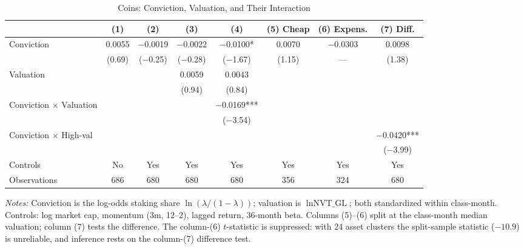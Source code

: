 \documentclass[12pt]{article}
\begin{document}
\begin{table}[ht]
\centering
\caption{Coins: Conviction, Valuation, and Their Interaction}
\label{tab:coin_ladder}
\small
\begin{tabular}{lccccccc}
\toprule
 & (1) & (2) & (3) & (4) & (5) Cheap & (6) Expens. & (7) Diff. \\
\midrule
Conviction & 0.0055 & $-$0.0019 & $-$0.0022 & $-$0.0100* & 0.0070 & $-$0.0303 & 0.0098 \\
 & (0.69) & ($-$0.25) & ($-$0.28) & ($-$1.67) & (1.15) & --- & (1.38) \\
Valuation & & & 0.0059 & 0.0043 & & & \\
 & & & (0.94) & (0.84) & & & \\
Conviction $\times$ Valuation & & & & $-$0.0169*** & & & \\
 & & & & ($-$3.54) & & & \\
Conviction $\times$ High-val & & & & & & & $-$0.0420*** \\
 & & & & & & & ($-$3.99) \\
\midrule
Controls & No & Yes & Yes & Yes & Yes & Yes & Yes \\
Observations & 686 & 680 & 680 & 680 & 356 & 324 & 680 \\
\bottomrule
\end{tabular}
\smallskip

\parbox{0.92\linewidth}{\footnotesize
\textit{Notes:} Conviction is the log-odds staking share $\ln(\lambda/(1-\lambda))$;
valuation is $\ln \text{NVT\_GL}$; both standardized within class-month. Controls: log
market cap, momentum (3m, 12--2), lagged return, 36-month beta. Columns (5)--(6) split
at the class-month median valuation; column (7) tests the difference. The column-(6)
$t$-statistic is suppressed: with 24 asset clusters the split-sample statistic
($-10.9$) is unreliable, and inference rests on the column-(7) difference test.}
\end{table}
\end{document}
